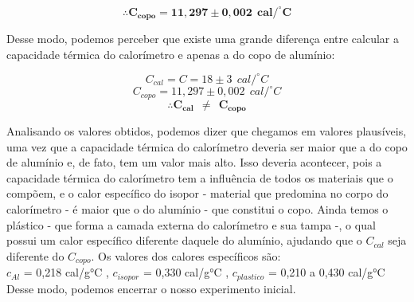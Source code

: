 \[ \therefore \mathbf{C_{copo} = 11,297 \pm 0,002 \ \ cal/^\circ C} \]

Desse modo, podemos perceber que existe uma grande diferença entre calcular a capacidade térmica do calorímetro e apenas a do copo de alumínio:

\[C_{cal} = C = 18 \pm 3  \ \  cal/^\circ C \]
\[C_{copo} = 11,297 \pm 0,002 \ \ cal/^\circ C\]
\[\mathbf{\therefore C_{cal}\ \  \neq \ \  C_{copo}}\] 

Analisando os valores obtidos, podemos dizer que chegamos em valores plausíveis, uma vez que a capacidade térmica do calorímetro deveria ser maior que a do copo de alumínio e, de fato, tem um valor mais alto. Isso deveria acontecer, pois a capacidade térmica do calorímetro tem a influência de todos os materiais que o compõem, e o calor específico do isopor - material que predomina no corpo do calorímetro - é maior que o do alumínio - que constitui o copo. Ainda temos o plástico - que forma a camada externa do calorímetro e sua tampa -, o qual possui um calor específico diferente daquele do alumínio, ajudando que o $C_{cal}$ seja diferente do $C_{copo}$. Os valores dos calores específicos são:\\

$ c_{Al}$ = 0,218  cal/g°C  , $ c_{isopor}$ = 0,330  cal/g°C , $ c_{plastico}$ = 0,210 a 0,430 cal/g°C\\ %

Desse modo, podemos encerrar o nosso experimento inicial.\\
